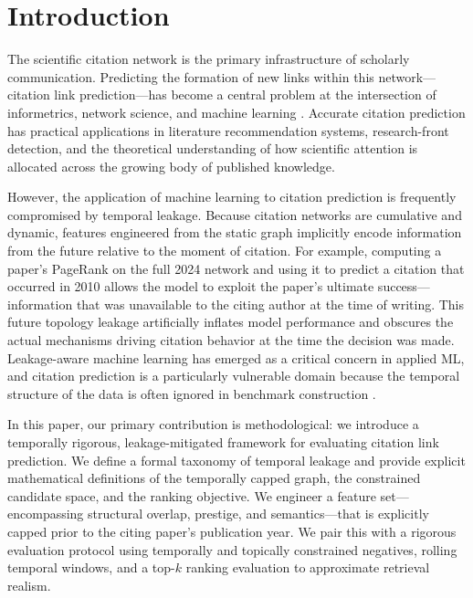 \documentclass[11pt,a4paper]{article}
\begin{document}
\section{Introduction}
\label{sec:intro}

The scientific citation network is the primary infrastructure of scholarly communication. Predicting the formation of new links within this network---citation link prediction---has become a central problem at the intersection of informetrics, network science, and machine learning \citep{wang2013quantifying, shibata2012link}. Accurate citation prediction has practical applications in literature recommendation systems, research-front detection, and the theoretical understanding of how scientific attention is allocated across the growing body of published knowledge.

However, the application of machine learning to citation prediction is frequently compromised by temporal leakage. Because citation networks are cumulative and dynamic, features engineered from the static graph implicitly encode information from the future relative to the moment of citation. For example, computing a paper's PageRank on the full 2024 network and using it to predict a citation that occurred in 2010 allows the model to exploit the paper's ultimate success---information that was unavailable to the citing author at the time of writing. This future topology leakage artificially inflates model performance and obscures the actual mechanisms driving citation behavior at the time the decision was made. Leakage-aware machine learning has emerged as a critical concern in applied ML, and citation prediction is a particularly vulnerable domain because the temporal structure of the data is often ignored in benchmark construction \citep{fortunato2018science}.

In this paper, our primary contribution is methodological: we introduce a temporally rigorous, leakage-mitigated framework for evaluating citation link prediction. We define a formal taxonomy of temporal leakage and provide explicit mathematical definitions of the temporally capped graph, the constrained candidate space, and the ranking objective. We engineer a feature set---encompassing structural overlap, prestige, and semantics---that is explicitly capped prior to the citing paper's publication year. We pair this with a rigorous evaluation protocol using temporally and topically constrained negatives, rolling temporal windows, and a top-$k$ ranking evaluation to approximate retrieval realism.
\end{document}
